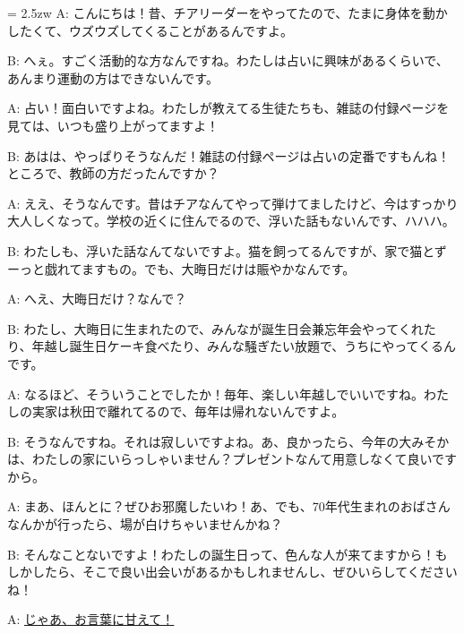 \documentclass[11pt]{amsart}
\title{}
\author{}
\newenvironment{hangall}[1]{\hangindent = 2.5zw\everypar{\hangindent = 2.5zw}}{}
\begin{document}
\maketitle
\begin{hangall}{}%
A: こんにちは！昔、チアリーダーをやってたので、たまに身体を動かしたくて、ウズウズしてくることがあるんですよ。

B: へぇ。すごく活動的な方なんですね。わたしは占いに興味があるくらいで、あんまり運動の方はできないんです。

A: 占い！面白いですよね。わたしが教えてる生徒たちも、雑誌の付録ページを見ては、いつも盛り上がってますよ！

B: あはは、やっぱりそうなんだ！雑誌の付録ページは占いの定番ですもんね！ところで、教師の方だったんですか？

A: ええ、そうなんです。昔はチアなんてやって弾けてましたけど、今はすっかり大人しくなって。学校の近くに住んでるので、浮いた話もないんです、ハハハ。

B: わたしも、浮いた話なんてないですよ。猫を飼ってるんですが、家で猫とずーっと戯れてますもの。でも、大晦日だけは賑やかなんです。

A: へえ、大晦日だけ？なんで？

B: わたし、大晦日に生まれたので、みんなが誕生日会兼忘年会やってくれたり、年越し誕生日ケーキ食べたり、みんな騒ぎたい放題で、うちにやってくるんです。

A: なるほど、そういうことでしたか！毎年、楽しい年越しでいいですね。わたしの実家は秋田で離れてるので、毎年は帰れないんですよ。

B: そうなんですね。それは寂しいですよね。あ、良かったら、今年の大みそかは、わたしの家にいらっしゃいません？プレゼントなんて用意しなくて良いですから。

A: まあ、ほんとに？ぜひお邪魔したいわ！あ、でも、70年代生まれのおばさんなんかが行ったら、場が白けちゃいませんかね？

B: そんなことないですよ！わたしの誕生日って、色んな人が来てますから！もしかしたら、そこで良い出会いがあるかもしれませんし、ぜひいらしてくださいね！

A: \ul{じゃあ、お言葉に甘えて！}\end{hangall}
\end{document}
